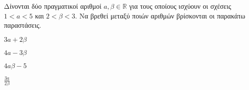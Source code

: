 Δίνονται δύο πραγματικοί αριθμοί $ a,\beta\in\mathbb{R} $ για τους οποίους ισχύουν οι σχέσεις $ 1<a<5 $ και $ 2<\beta<3 $. Να βρεθεί μεταξύ ποιών αριθμών βρίσκονται οι παρακάτω παραστάσεις.
\begin{multicols}{2}
\begin{alist}
\item $ 3a+2\beta $
\item $ 4a-3\beta $
\item $ 4a\beta-5 $
\item $ \frac{3a}{2\beta} $
\end{alist}
\end{multicols}
